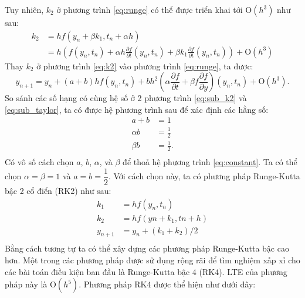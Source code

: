 \documentclass[a4paper]{article}
\begin{document}
Tuy nhiên, $k_2$ ở phương trình \eqref{eq:runge} có thể được triển khai tới $\mbox{O}(h^3)$ như sau:
\begin{equation}\label{eq:k2}
    \begin{aligned}
        k_2 &= hf(y_n+\beta k_1, t_n + \alpha h) \\
            &= h\left( f(y_n,t_n) + \alpha h\frac{\partial f}{\partial t} (y_n,t_n) + \beta k_1 \frac{\partial f}{\partial t} (y_n, t_n)\right) + {\mbox{O}}(h^3)
    \end{aligned}
\end{equation}
Thay $k_2$ ở phương trình \eqref{eq:k2} vào phương trình \eqref{eq:runge}, ta được:
\begin{equation}\label{eq:sub_k2}
    y_{n+1} = y_n + (a+b) h f(y_n,t_n) + bh^2(\alpha \frac {\partial f}{\partial t} +
    \beta f \frac {\partial f}{\partial y})(y_n,t_n) + {\mbox{O}}(h^3).
\end{equation}
So sánh các số hạng có cùng hệ số ở 2 phương trình \eqref{eq:sub_k2} và \eqref{eq:sub_taylor}, ta có được hệ phương trình sau để xác định các hằng số:
\begin{equation}\label{eq:constant}
\begin{aligned}
 	 a + b    &= 1	            \\
 	 \alpha b &= \frac{1}{2}    \\
 	 \beta b  &= \frac{1}{2}.	\\
\end{aligned}
\end{equation}
Có vô số cách chọn $a$, $b$, $\alpha$, và $\beta$ để thoả hệ phương trình \eqref{eq:constant}. Ta có thể chọn $\alpha = \beta = 1$ và $a = b = \dfrac{1}{2}$. Với cách chọn này, ta có phương pháp Runge-Kutta bậc 2 cổ điển (RK2) như sau:
\begin{equation}\label{eq:RK2}
    \begin{aligned}
 	 	k_1     &= hf(y_n,t_n)	         \\
 	 	k_2     &= hf(yn+k_1, tn + h)	 \\
 	 	y_{n+1} &= y_n + (k_1 + k_2)/2   \\         
    \end{aligned}
\end{equation}
Bằng cách tương tự ta có thể xây dựng các phương pháp Runge-Kutta bậc cao hơn. Một trong các phương pháp được sử dụng rộng rãi để tìm nghiệm xấp xỉ cho các bài toán điều kiện ban đầu là Runge-Kutta bậc 4 (RK4). LTE của phương pháp này là $\mbox{O}(h^5)$. Phương pháp RK4 được thể hiện như dưới đây:
\end{document}
